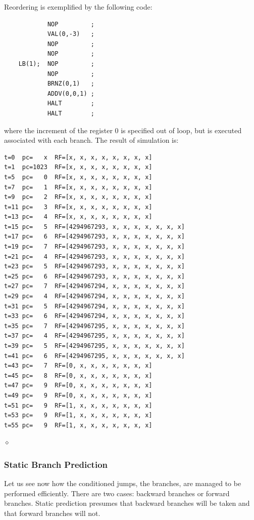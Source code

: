 \begin{exemplu}
Reordering is exemplified by the following code:
\begin{verbatim}
            NOP         ;
            VAL(0,-3)   ;
            NOP         ;
            NOP         ;
    LB(1);  NOP         ;
            NOP         ;
            BRNZ(0,1)   ;
            ADDV(0,0,1) ;
            HALT        ;
            HALT        ;
\end{verbatim}
where the increment of the register 0 is specified out of loop, but is executed associated with each branch.
The result of simulation is:
{\small
\begin{verbatim}
t=0  pc=   x  RF=[x, x, x, x, x, x, x, x]
t=1  pc=1023  RF=[x, x, x, x, x, x, x, x]
t=5  pc=   0  RF=[x, x, x, x, x, x, x, x]
t=7  pc=   1  RF=[x, x, x, x, x, x, x, x]
t=9  pc=   2  RF=[x, x, x, x, x, x, x, x]
t=11 pc=   3  RF=[x, x, x, x, x, x, x, x]
t=13 pc=   4  RF=[x, x, x, x, x, x, x, x]
t=15 pc=   5  RF=[4294967293, x, x, x, x, x, x, x] 	
t=17 pc=   6  RF=[4294967293, x, x, x, x, x, x, x] 	
t=19 pc=   7  RF=[4294967293, x, x, x, x, x, x, x] 	
t=21 pc=   4  RF=[4294967293, x, x, x, x, x, x, x] 	
t=23 pc=   5  RF=[4294967293, x, x, x, x, x, x, x] 	
t=25 pc=   6  RF=[4294967293, x, x, x, x, x, x, x] 	
t=27 pc=   7  RF=[4294967294, x, x, x, x, x, x, x] 	
t=29 pc=   4  RF=[4294967294, x, x, x, x, x, x, x] 	
t=31 pc=   5  RF=[4294967294, x, x, x, x, x, x, x] 	
t=33 pc=   6  RF=[4294967294, x, x, x, x, x, x, x] 	
t=35 pc=   7  RF=[4294967295, x, x, x, x, x, x, x] 	
t=37 pc=   4  RF=[4294967295, x, x, x, x, x, x, x] 	
t=39 pc=   5  RF=[4294967295, x, x, x, x, x, x, x] 	
t=41 pc=   6  RF=[4294967295, x, x, x, x, x, x, x] 	
t=43 pc=   7  RF=[0, x, x, x, x, x, x, x]
t=45 pc=   8  RF=[0, x, x, x, x, x, x, x]
t=47 pc=   9  RF=[0, x, x, x, x, x, x, x]
t=49 pc=   9  RF=[0, x, x, x, x, x, x, x]
t=51 pc=   9  RF=[1, x, x, x, x, x, x, x]
t=53 pc=   9  RF=[1, x, x, x, x, x, x, x]
t=55 pc=   9  RF=[1, x, x, x, x, x, x, x]
\end{verbatim}
}


$\diamond$
\end{exemplu}


\subsubsection{Static Branch Prediction}

Let us see now how the conditioned jumps, the branches, are managed to be performed efficiently. There are two cases: backward branches or forward branches. Static prediction presumes that backward branches will be taken and that forward branches will not.

